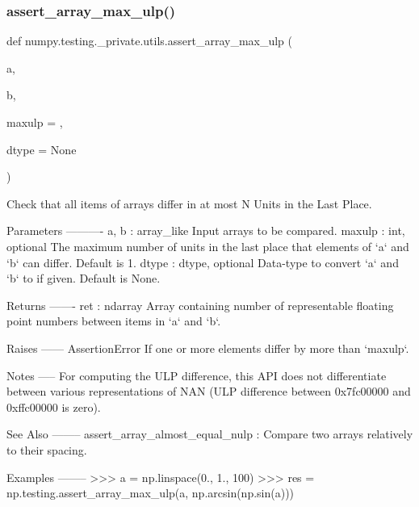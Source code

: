 \subsubsection{\texorpdfstring{assert\+\_\+array\+\_\+max\+\_\+ulp()}{assert\_array\_max\_ulp()}}
{\footnotesize\ttfamily def numpy.\+testing.\+\_\+private.\+utils.\+assert\+\_\+array\+\_\+max\+\_\+ulp (\begin{DoxyParamCaption}\item[{}]{a,  }\item[{}]{b,  }\item[{}]{maxulp = {},  }\item[{}]{dtype = {\ttfamily None} }\end{DoxyParamCaption})}

\begin{DoxyVerb}Check that all items of arrays differ in at most N Units in the Last Place.

Parameters
----------
a, b : array_like
    Input arrays to be compared.
maxulp : int, optional
    The maximum number of units in the last place that elements of `a` and
    `b` can differ. Default is 1.
dtype : dtype, optional
    Data-type to convert `a` and `b` to if given. Default is None.

Returns
-------
ret : ndarray
    Array containing number of representable floating point numbers between
    items in `a` and `b`.

Raises
------
AssertionError
    If one or more elements differ by more than `maxulp`.

Notes
-----
For computing the ULP difference, this API does not differentiate between
various representations of NAN (ULP difference between 0x7fc00000 and 0xffc00000
is zero).

See Also
--------
assert_array_almost_equal_nulp : Compare two arrays relatively to their
    spacing.

Examples
--------
>>> a = np.linspace(0., 1., 100)
>>> res = np.testing.assert_array_max_ulp(a, np.arcsin(np.sin(a)))\end{DoxyVerb}
 \mbox{\label{namespacenumpy_1_1testing_1_1__private_1_1utils_a3dfd2c9aaf0d24a18ca8eae721df7a5d}} 
